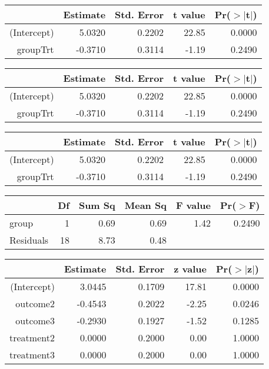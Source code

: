 \begin{table}[ht]
\begin{tabular}{rrrrr}
  \hline
 & Estimate & Std. Error & t value & Pr($>$$|$t$|$) \\ 
  \hline
(Intercept) & 5.0320 & 0.2202 & 22.85 & 0.0000 \\ 
  groupTrt & -0.3710 & 0.3114 & -1.19 & 0.2490 \\ 
   \hline
\end{tabular}
\end{table}
\begin{table}[ht]
\begin{tabular}{rrrrr}
  \hline
 & Estimate & Std. Error & t value & Pr($>$$|$t$|$) \\ 
  \hline
(Intercept) & 5.0320 & 0.2202 & 22.85 & 0.0000 \\ 
  groupTrt & -0.3710 & 0.3114 & -1.19 & 0.2490 \\ 
   \hline
\end{tabular}
\end{table}
\begin{table}[ht]
\centering
\begin{tabular}{rrrrr}
  \hline
 & Estimate & Std. Error & t value & Pr($>$$|$t$|$) \\ 
  \hline
(Intercept) & 5.0320 & 0.2202 & 22.85 & 0.0000 \\ 
  groupTrt & -0.3710 & 0.3114 & -1.19 & 0.2490 \\ 
   \hline
\end{tabular}
\end{table}
\begin{table}[ht]
\centering
\begin{tabular}{lrrrrr}
  \hline
 & Df & Sum Sq & Mean Sq & F value & Pr($>$F) \\ 
  \hline
group & 1 & 0.69 & 0.69 & 1.42 & 0.2490 \\ 
  Residuals & 18 & 8.73 & 0.48 &  &  \\ 
   \hline
\end{tabular}
\end{table}
\begin{table}[ht]
\centering
\begin{tabular}{rrrrr}
  \hline
 & Estimate & Std. Error & z value & Pr($>$$|$z$|$) \\ 
  \hline
(Intercept) & 3.0445 & 0.1709 & 17.81 & 0.0000 \\ 
  outcome2 & -0.4543 & 0.2022 & -2.25 & 0.0246 \\ 
  outcome3 & -0.2930 & 0.1927 & -1.52 & 0.1285 \\ 
  treatment2 & 0.0000 & 0.2000 & 0.00 & 1.0000 \\ 
  treatment3 & 0.0000 & 0.2000 & 0.00 & 1.0000 \\ 
   \hline
\end{tabular}
\end{table}

